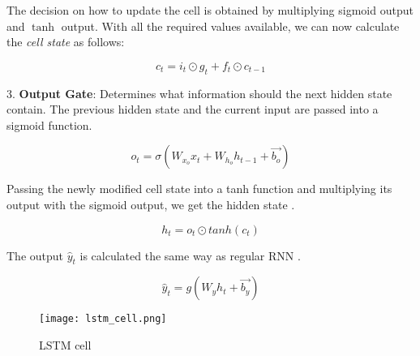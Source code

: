 The decision on how to update the cell is obtained by multiplying sigmoid output and $\tanh$ output. With all the required values available, we can now calculate the \textit{cell state} as follows:

\begin{equation}
    {c_t = i_t \odot g_t + f_t \odot c_{t-1}}
\end{equation}


3. \textbf{Output Gate}: Determines what information should the next hidden state contain. The previous hidden state and the current input are passed into a sigmoid function.

\begin{equation}
    {o_t = \sigma(W_{x_o}x_t + W_{h_o}h_{t-1}+\vec{b_o})}
\end{equation}

Passing the newly modified cell state into a tanh function and multiplying its output with the sigmoid output, we get the hidden state \cite{guideLSTM}.

\begin{equation}
    {h_t = o_t \odot tanh(c_t)}
\end{equation}


The output $\hat{y}_t$ is calculated the same way as regular RNN \cite{matous}.

\begin{equation}
    {\hat{y}_t = g(W_{y}h_t + \vec{b_y})}
\end{equation}

\begin{figure}[h]
    \centering
    \texttt{[image: lstm\_cell.png]}
    \caption{LSTM cell \cite{lstmcell_img}}
    \label{fig:lstmCell}
\end{figure}
